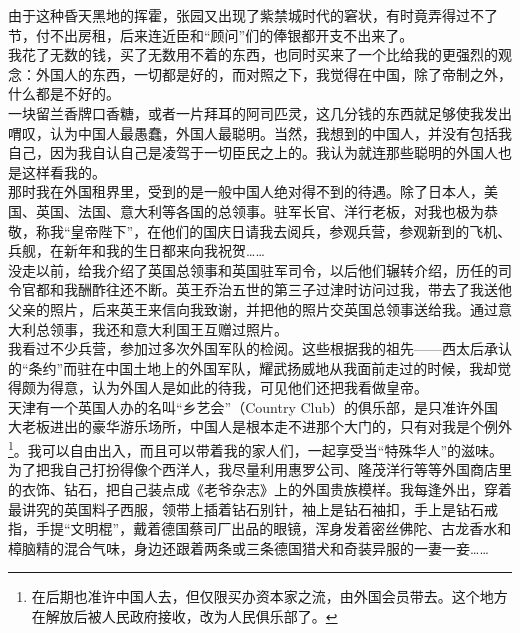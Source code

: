 由于这种昏天黑地的挥霍，张园又出现了紫禁城时代的窘状，有时竟弄得过不了节，付不出房租，后来连近臣和“顾问”们的俸银都开支不出来了。\\

我花了无数的钱，买了无数用不着的东西，也同时买来了一个比给我的更强烈的观念：外国人的东西，一切都是好的，而对照之下，我觉得在中国，除了帝制之外，什么都是不好的。\\

一块留兰香牌口香糖，或者一片拜耳的阿司匹灵，这几分钱的东西就足够使我发出喟叹，认为中国人最愚蠢，外国人最聪明。当然，我想到的中国人，并没有包括我自己，因为我自认自己是凌驾于一切臣民之上的。我认为就连那些聪明的外国人也是这样看我的。\\

那时我在外国租界里，受到的是一般中国人绝对得不到的待遇。除了日本人，美国、英国、法国、意大利等各国的总领事。驻军长官、洋行老板，对我也极为恭敬，称我“皇帝陛下”，在他们的国庆日请我去阅兵，参观兵营，参观新到的飞机、兵舰，在新年和我的生日都来向我祝贺……\\

没走以前，给我介绍了英国总领事和英国驻军司令，以后他们辗转介绍，历任的司令官都和我酬酢往还不断。英王乔治五世的第三子过津时访问过我，带去了我送他父亲的照片，后来英王来信向我致谢，并把他的照片交英国总领事送给我。通过意大利总领事，我还和意大利国王互赠过照片。\\

我看过不少兵营，参加过多次外国军队的检阅。这些根据我的祖先——西太后承认的“条约”而驻在中国土地上的外国军队，耀武扬威地从我面前走过的时候，我却觉得颇为得意，认为外国人是如此的待我，可见他们还把我看做皇帝。\\

天津有一个英国人办的名叫“乡艺会”（Country Club）的俱乐部，是只准许外国大老板进出的豪华游乐场所，中国人是根本走不进那个大门的，只有对我是个例外\footnote{在后期也准许中国人去，但仅限买办资本家之流，由外国会员带去。这个地方在解放后被人民政府接收，改为人民俱乐部了。}。我可以自由出入，而且可以带着我的家人们，一起享受当“特殊华人”的滋味。\\

为了把我自己打扮得像个西洋人，我尽量利用惠罗公司、隆茂洋行等等外国商店里的衣饰、钻石，把自己装点成《老爷杂志》上的外国贵族模样。我每逢外出，穿着最讲究的英国料子西服，领带上插着钻石别针，袖上是钻石袖扣，手上是钻石戒指，手提“文明棍”，戴着德国蔡司厂出品的眼镜，浑身发着密丝佛陀、古龙香水和樟脑精的混合气味，身边还跟着两条或三条德国猎犬和奇装异服的一妻一妾……\\

